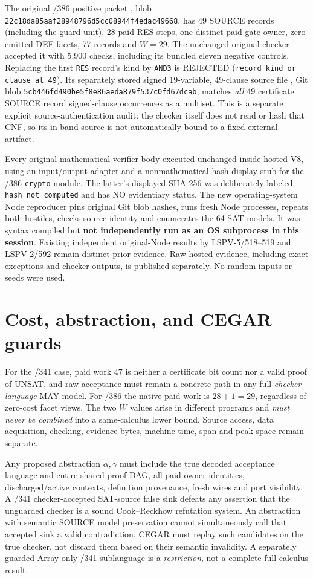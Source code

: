 \documentclass[11pt]{article}
\begin{document}
The original /386 positive packet , blob \texttt{22c18da85aaf28948796d5cc08944f4edac49668}, has 49 SOURCE records (including the guard unit), 28 paid RES steps, one distinct paid gate owner, zero emitted DEF facets, 77 records and $W=29$. The unchanged original checker accepted it with 5,900 checks, including its bundled eleven negative controls. Replacing the first \texttt{RES} record's kind by \texttt{AND3} is REJECTED (\texttt{record kind or clause at 49}). Its separately stored signed 19-variable, 49-clause source file
, Git blob
\texttt{5cb446fd490be5f8e86aeda879f537c0fd67dcab},
matches \emph{all} 49 certificate SOURCE record signed-clause occurrences as a multiset. This is a separate explicit source-authentication audit: the checker itself does not read or hash that CNF, so its in-band source is not automatically bound to a fixed external artifact.

Every original mathematical-verifier body executed unchanged inside hosted V8, using an input/output adapter and a nonmathematical hash-display stub for the /386 \texttt{crypto} module. The latter's displayed SHA-256 was deliberately labeled \texttt{hash not computed} and has NO evidentiary status. The new operating-system Node reproducer pins original Git blob hashes, runs fresh Node processes, repeats both hostiles, checks source identity and enumerates the 64 SAT models. It was syntax compiled but \textbf{not independently run as an OS subprocess in this session}. Existing independent original-Node results by LSPV-5/518--519 and LSPV-2/592 remain distinct prior evidence. Raw hosted evidence, including exact exceptions and checker outputs, is published separately. No random inputs or seeds were used.

\section*{Cost, abstraction, and CEGAR guards}
For the /341 case, paid work 47 is neither a certificate bit count nor a valid proof of UNSAT, and raw acceptance must remain a concrete path in any full \emph{checker-language} MAY model. For /386 the native paid work is $28+1=29$, regardless of zero-cost facet views. The two $W$ values arise in different programs and \emph{must never be combined} into a same-calculus lower bound. Source access, data acquisition, checking, evidence bytes, machine time, span and peak space remain separate.

Any proposed abstraction $\alpha,\gamma$ must include the true decoded acceptance language and entire shared proof DAG, all paid-owner identities, discharged/active contexts, definition provenance, fresh wires and port visibility. A /341 checker-accepted SAT-source false sink defeats any assertion that the unguarded checker is a sound Cook--Reckhow refutation system. An abstraction with semantic SOURCE model preservation cannot simultaneously call that accepted sink a valid contradiction. CEGAR must replay such candidates on the true checker, not discard them based on their semantic invalidity. A separately guarded Array-only /341 sublanguage is a \emph{restriction}, not a complete full-calculus result.
\end{document}
